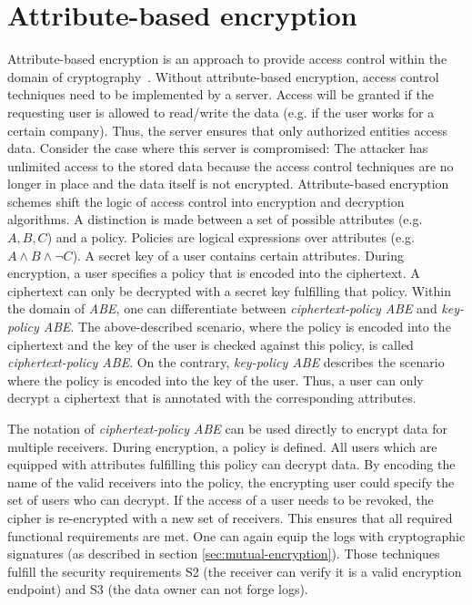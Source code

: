 \documentclass[../main.tex]{subfiles}
\begin{document}
\section{Attribute-based encryption}
\label{sec:attribute-encryption}
Attribute-based encryption is an approach to provide access control within the domain of cryptography~\cite{Bethencourt2007}. 
Without attribute-based encryption, access control techniques need to be implemented by a server. 
Access will be granted if the requesting user is allowed to read/write the data (e.g. if the user works for a certain company). 
Thus, the server ensures that only authorized entities access data. 
Consider the case where this server is compromised: 
The attacker has unlimited access to the stored data because the access control techniques are no longer in place and the data itself is not encrypted.
Attribute-based encryption schemes shift the logic of access control into encryption and decryption algorithms. 
A distinction is made between a set of possible attributes (e.g. ${A,B,C}$) and a policy. 
Policies are logical expressions over attributes (e.g. $A \land B \land \neg C$). 
A secret key of a user contains certain attributes. 
During encryption, a user specifies a policy that is encoded into the ciphertext.
A ciphertext can only be decrypted with a secret key fulfilling that policy.
Within the domain of \textit{ABE}, one can differentiate between \textit{ciphertext-policy ABE} and \textit{key-policy ABE}. 
The above-described scenario, where the policy is encoded into the ciphertext and the key of the user is checked against this policy, is called \textit{ciphertext-policy ABE}. 
On the contrary, \textit{key-policy ABE} describes the scenario where the policy is encoded into the key of the user.
Thus, a user can only decrypt a ciphertext that is annotated with the corresponding attributes.~\cite{Bethencourt2007}

The notation of \textit{ciphertext-policy ABE} can be used directly to encrypt data for multiple receivers. 
During encryption, a policy is defined. 
All users which are equipped with attributes fulfilling this policy can decrypt data.
By encoding the name of the valid receivers into the policy, the encrypting user could specify the set of users who can decrypt.
If the access of a user needs to be revoked, the cipher is re-encrypted with a new set of receivers.
This ensures that all required functional requirements are met.
One can again equip the logs with cryptographic signatures (as described in section \ref{sec:mutual-encryption}).
Those techniques fulfill the security requirements S2 (the receiver can verify it is a valid encryption endpoint) and S3 (the data owner can not forge logs).
\end{document}
